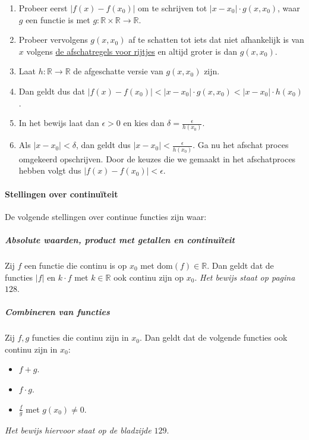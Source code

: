 \begin{enumerate}
    \setlength\itemsep{0em}
    \item Probeer eerst $|f(x)-f(x_{0})|$ om te schrijven tot $|x-x_{0}| \cdot g(x,x_{0})$, waar $g$ een functie is met $g:\mathbb{R}\times\mathbb{R}\to\mathbb{R}$.
    \item Probeer vervolgens $g(x,x_{0})$ af te schatten tot iets dat niet afhankelijk is van $x$ volgens \hyperref[sec:afschatten]{de afschatregels voor rijtjes} en altijd groter is dan $g(x,x_{0})$.
    \item Laat $h:\mathbb{R}\to\mathbb{R}$ de afgeschatte versie van $g(x,x_{0})$ zijn.
    \item Dan geldt dus dat $|f(x)-f(x_{0})|<|x-x_{0}| \cdot g(x,x_{0}) < |x-x_{0}| \cdot h(x_0)$.
    \item In het bewijs laat dan $\epsilon>0$ en kies dan $\delta=\frac{\epsilon}{h(x_{0})}$.
    \item Als $|x-x_{0}|<\delta$, dan geldt dus $|x-x_{0}|<\frac{\epsilon}{h(x_{0})}$. Ga nu het afschat proces omgekeerd opschrijven. Door de keuzes die we gemaakt in het afschatproces hebben volgt dus $|f(x)-f(x_{0})|<\epsilon$.
\end{enumerate}

\paragraph{Stellingen over continuïteit} De volgende stellingen over continue functies zijn waar:

\subparagraph{Absolute waarden, product met getallen en continuïteit} Zij $f$ een functie die continu is op $x_0$ met $\text{dom}(f)\in\mathbb{R}$. Dan geldt dat de functies $|f|$ en $k \cdot f$ met $k\in\mathbb{R}$ ook continu zijn op $x_{0}$. \textit{Het bewijs staat op pagina $128$}.

\subparagraph{Combineren van functies} Zij $f,g$ functies die continu zijn in $x_{0}$. Dan geldt dat de volgende functies ook continu zijn in $x_{0}$:

\begin{itemize}
    \setlength\itemsep{0em}
    \item $f + g$.
    \item $f \cdot g$.
    \item $\frac{f}{g}$ met $g(x_{0})\neq0$.
\end{itemize}

\textit{Het bewijs hiervoor staat op de bladzijde $129$}.

